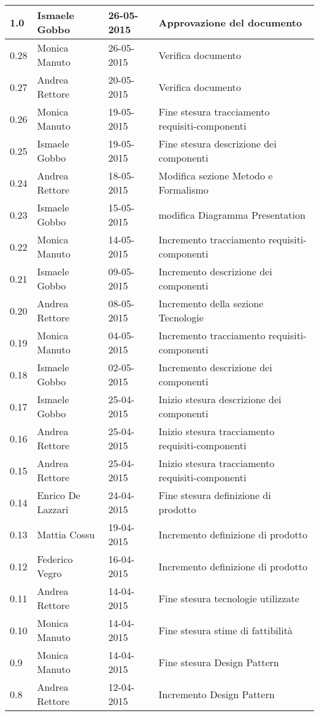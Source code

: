 \begin{longtable}{|l|l|l|p{}|}
\hline
1.0 & Ismaele Gobbo & 26-05-2015 & Approvazione del documento \\
\hline
0.28 & Monica Manuto & 26-05-2015 & Verifica documento \\
\hline
0.27 & Andrea Rettore & 20-05-2015 & Verifica documento \\
\hline
0.26 & Monica Manuto & 19-05-2015 & Fine stesura tracciamento requisiti-componenti \\
\hline
0.25 & Ismaele Gobbo & 19-05-2015 & Fine stesura descrizione dei componenti \\
\hline
0.24 & Andrea Rettore & 18-05-2015 & Modifica sezione Metodo e Formalismo \\
\hline
0.23 & Ismaele Gobbo & 15-05-2015 & modifica Diagramma Presentation \\
\hline
0.22 & Monica Manuto & 14-05-2015 & Incremento tracciamento requisiti-componenti \\
\hline
0.21 & Ismaele Gobbo & 09-05-2015 & Incremento descrizione dei componenti \\
\hline
0.20 & Andrea Rettore & 08-05-2015 & Incremento della sezione Tecnologie \\
\hline
0.19 & Monica Manuto & 04-05-2015 & Incremento tracciamento requisiti-componenti \\
\hline
0.18 & Ismaele Gobbo & 02-05-2015 & Incremento descrizione dei componenti \\
\hline
0.17 & Ismaele Gobbo & 25-04-2015 & Inizio stesura descrizione dei componenti \\
\hline
0.16 & Andrea Rettore & 25-04-2015 & Inizio stesura tracciamento requisiti-componenti \\
\hline
0.15 & Andrea Rettore & 25-04-2015 & Inizio stesura tracciamento requisiti-componenti \\
\hline
0.14 & Enrico De Lazzari & 24-04-2015 & Fine stesura definizione di prodotto \\
\hline
0.13 & Mattia Cossu & 19-04-2015 & Incremento definizione di prodotto \\
\hline
0.12 & Federico Vegro & 16-04-2015 & Incremento definizione di prodotto \\
\hline
0.11 & Andrea Rettore & 14-04-2015 & Fine stesura tecnologie utilizzate \\
\hline
0.10 & Monica Manuto & 14-04-2015 & Fine stesura stime di fattibilità \\
\hline
0.9 & Monica Manuto & 14-04-2015 & Fine stesura Design Pattern \\
\hline
0.8 & Andrea Rettore & 12-04-2015 & Incremento Design Pattern \\

\end{longtable}
